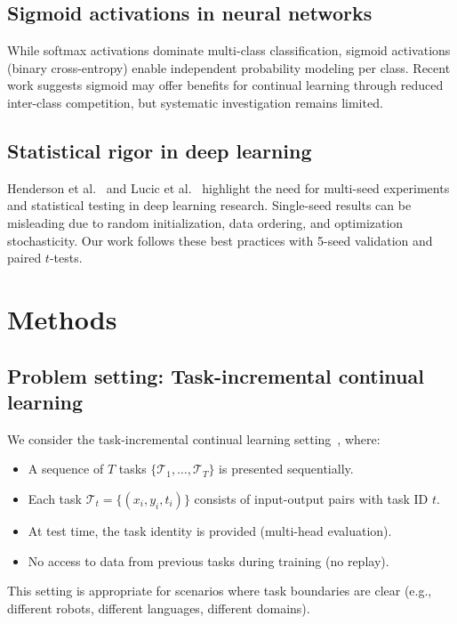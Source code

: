 \documentclass[preprint,review,12pt]{elsarticle}
\begin{document}
\subsection{Sigmoid activations in neural networks}

While softmax activations dominate multi-class classification, sigmoid activations (binary cross-entropy) enable independent probability modeling per class. Recent work suggests sigmoid may offer benefits for continual learning through reduced inter-class competition, but systematic investigation remains limited.

\subsection{Statistical rigor in deep learning}

Henderson et al.~\cite{henderson2018deep} and Lucic et al.~\cite{lucic2018gans} highlight the need for multi-seed experiments and statistical testing in deep learning research. Single-seed results can be misleading due to random initialization, data ordering, and optimization stochasticity. Our work follows these best practices with 5-seed validation and paired $t$-tests.

\section{Methods}

\subsection{Problem setting: Task-incremental continual learning}

We consider the task-incremental continual learning setting~\cite{van2019three}, where:
\begin{itemize}
\item A sequence of $T$ tasks $\{\mathcal{T}_1, \ldots, \mathcal{T}_T\}$ is presented sequentially.
\item Each task $\mathcal{T}_t = \{(x_i, y_i, t_i)\}$ consists of input-output pairs with task ID $t$.
\item At test time, the task identity is provided (multi-head evaluation).
\item No access to data from previous tasks during training (no replay).
\end{itemize}

This setting is appropriate for scenarios where task boundaries are clear (e.g., different robots, different languages, different domains).
\end{document}
